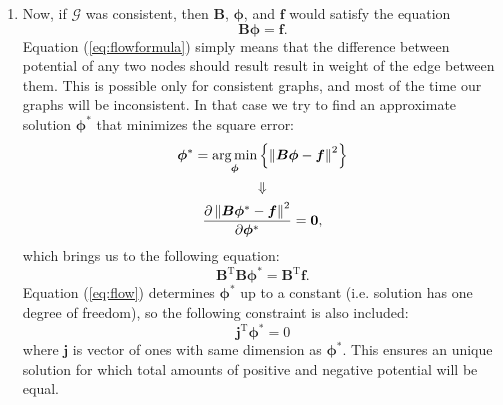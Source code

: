 \documentclass[letterpaper, 10 pt, conference]{ieeeconf}
\newcommand{\matr}[1]{\mathbold{#1}}
\newcommand{\graph}[1]{\bm{\mathcal{#1}}}
\newcommand{\T}{\mathrm{T}}
\DeclareMathOperator*{\argmin}{arg\min}
\begin{document}
\begin{enumerate}
    \item Now, if $\graph{G}$ was consistent, then $\matr{B}$, $\matr{\phi}$, and $\matr{f}$ would satisfy the equation
    \begin{equation}
    \label{eq:flowformula}
    \matr{B} \matr{\phi} = \matr{f}.
    \end{equation}
    Equation (\ref{eq:flowformula}) simply means that the difference between potential of any two nodes should result result in weight of the edge between them.
    This is possible only for consistent graphs, and most of the time our graphs will be inconsistent.
    In that case we try to find an approximate solution $\matr{\phi^*}$ that minimizes the square error:
    \begin{equation*}
    \begin{gathered}
    \matr{\phi^*} = \argmin_{\matr{\phi}} \left\{ \left \lVert \matr{B} \matr{\phi} - \matr{f}\textsl{} \right \rVert ^ 2 \right\} \\ \Downarrow \\
    \frac{\partial \left \lVert \matr{B} \matr{\phi^*} - \matr{f} \right \rVert ^ 2}{\partial \matr{\phi^*}} = \mathbf{0},
    \end{gathered}
    \end{equation*}
    which brings us to the following equation:
    \begin{equation}
    \label{eq:flow}
    \matr{B}^\T \matr{B} \matr{\phi^*} = \matr{B}^\T \matr{f}.
    \end{equation}
    Equation (\ref{eq:flow}) determines $\matr{\phi^*}$ up to a constant (i.e. solution has one degree of freedom), so the following constraint is also included:
    \begin{equation}
    \label{eq:sumiszero}
    \matr{j}^\T \matr{\phi^*} = 0
    \end{equation}
    where $\matr{j}$ is vector of ones with same dimension as $\matr{\phi^*}$.
    This ensures an unique solution for which total amounts of positive and negative potential will be equal.
    

\end{enumerate}
\end{document}
